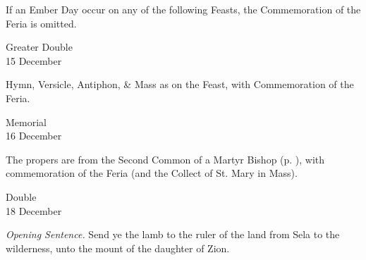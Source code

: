 \begin{rubric}
	If an Ember Day occur on any of the following Feasts, the Commemoration of the Feria is omitted.
\end{rubric}


\begin{inhead}
    {Greater Double\\
15 December}
\end{inhead}

\begin{rubric}
	Hymn, Versicle, Antiphon, \& Mass as on the Feast, with Commemoration of the Feria.
\end{rubric}


\begin{inhead}
    {Memorial\\
16 December}
\end{inhead}

\begin{rubric}
	The propers are from the Second Common of a Martyr Bishop (p. \pageref{CommonMartyrBishopII}), with commemoration of the Feria (and the Collect of St. Mary in Mass).
\end{rubric}


\begin{inhead}
    {Double\\
18 December}
\end{inhead}
\par\noindent
\textit{Opening Sentence.} Send ye the lamb to the ruler of the land from Sela to the wilderness, unto the mount of the daughter of Zion.\par

